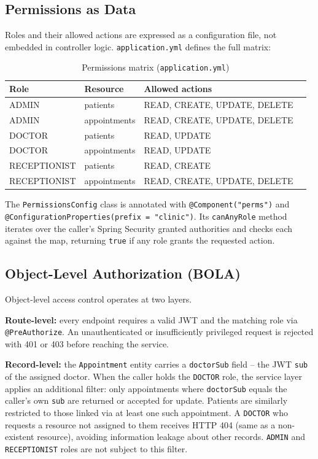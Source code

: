 \documentclass[12pt,a4paper]{report}
\begin{document}
\subsection{Permissions as Data}

Roles and their allowed actions are expressed as a configuration file, not embedded in
controller logic. \texttt{application.yml} defines the full matrix:

\begin{table}[H]
\centering\small
\caption{Permissions matrix (\texttt{application.yml})}
\begin{tabular}{llll}
\toprule
\textbf{Role}  & \textbf{Resource}    & \textbf{Allowed actions} \\
\midrule
ADMIN          & patients             & READ, CREATE, UPDATE, DELETE \\
ADMIN          & appointments         & READ, CREATE, UPDATE, DELETE \\
DOCTOR         & patients             & READ, UPDATE \\
DOCTOR         & appointments         & READ, UPDATE \\
RECEPTIONIST   & patients             & READ, CREATE \\
RECEPTIONIST   & appointments         & READ, CREATE, UPDATE, DELETE \\
\bottomrule
\end{tabular}
\end{table}

The \texttt{PermissionsConfig} class is annotated with \texttt{@Component("perms")} and
\texttt{@ConfigurationProperties(prefix = "clinic")}. Its \texttt{canAnyRole} method
iterates over the caller's Spring Security granted authorities and checks each against
the map, returning \texttt{true} if any role grants the requested action.

\subsection{Object-Level Authorization (BOLA)}

Object-level access control operates at two layers.

\textbf{Route-level:} every endpoint requires a valid JWT and the matching role via
\texttt{@PreAuthorize}. An unauthenticated or insufficiently privileged request is
rejected with 401 or 403 before reaching the service.

\textbf{Record-level:} the \texttt{Appointment} entity carries a \texttt{doctorSub}
field -- the JWT \texttt{sub} of the assigned doctor. When the caller holds the
\texttt{DOCTOR} role, the service layer applies an additional filter: only appointments
where \texttt{doctorSub} equals the caller's own \texttt{sub} are returned or accepted
for update. Patients are similarly restricted to those linked via at least one such
appointment. A \texttt{DOCTOR} who requests a resource not assigned to them receives
HTTP 404 (same as a non-existent resource), avoiding information leakage about other
records. \texttt{ADMIN} and \texttt{RECEPTIONIST} roles are not subject to this filter.
\end{document}
